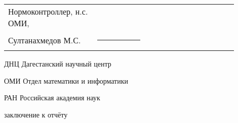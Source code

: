 \documentclass[utf8,usehyperref,12pt]{G7-32}
\begin{document}

\frontmatter %

\NirTitle{%





} %


\Executors %
\begin{longtable}{p{0.35\linewidth}p{0.2\linewidth}p{0.35\linewidth}}




Нормоконтроллер, н.с. ОМИ,  &		&	\\
Султанахмедов М.С. & \rule{1\linewidth}{0.1pt}& \\
\end{longtable}



\setcounter{tocdepth}{2} %

\tableofcontents



\Abbreviations %
\begin{abbreviation}
\item[ДНЦ] Дагестанский научный центр
\item[ОМИ] Отдел математики и информатики
\item[РАН] Российская академия наук
\end{abbreviation}




\mainmatter %


%


%
%
%
%
%
%
%
%



\backmatter %

 заключение к отчёту



\end{document}
